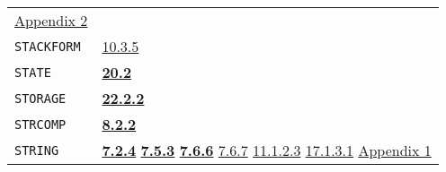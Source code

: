 \documentclass[a4paper,]{article}
\begin{document}
\begin{longtable}[]{@{}ll@{}}
\begin{minipage}[t]{0.70\columnwidth}
\href{appendix-2-predefined-subroutines.md\#appendix-2-predefined-subroutines}{Appendix 2}\strut
\end{minipage}\tabularnewline
\begin{minipage}[t]{0.24\columnwidth}\raggedright\strut
\texttt{STACKFORM}\strut
\end{minipage} & \begin{minipage}[t]{0.70\columnwidth}\raggedright\strut
\href{10-looping.md\#1035-stackform}{10.3.5}\strut
\end{minipage}\tabularnewline
\begin{minipage}[t]{0.24\columnwidth}\raggedright\strut
\texttt{STATE}\strut
\end{minipage} & \begin{minipage}[t]{0.70\columnwidth}\raggedright\strut
\textbf{\href{20-coroutines.md\#202-state-of-a-process}{20.2}}\strut
\end{minipage}\tabularnewline
\begin{minipage}[t]{0.24\columnwidth}\raggedright\strut
\texttt{STORAGE}\strut
\end{minipage} & \begin{minipage}[t]{0.70\columnwidth}\raggedright\strut
\textbf{\href{22-storage-management.md\#2222-non-garbage-collected-storage-the-primtype}{22.2.2}}\strut
\end{minipage}\tabularnewline
\begin{minipage}[t]{0.24\columnwidth}\raggedright\strut
\texttt{STRCOMP}\strut
\end{minipage} & \begin{minipage}[t]{0.70\columnwidth}\raggedright\strut
\textbf{\href{08-truth.md\#822-equality-and-membership-1}{8.2.2}}\strut
\end{minipage}\tabularnewline
\begin{minipage}[t]{0.24\columnwidth}\raggedright\strut
\texttt{STRING}\strut
\end{minipage} & \begin{minipage}[t]{0.70\columnwidth}\raggedright\strut
\textbf{\href{07-structured-objects.md\#724-string-1}{7.2.4}}
\textbf{\href{07-structured-objects.md\#753-list-vector-uvector-and-string-the-subrs-1}{7.5.3}}
\textbf{\href{07-structured-objects.md\#766-string-the-primtype-and-character-1}{7.6.6}}
\href{07-structured-objects.md\#767-bytes}{7.6.7} \href{11-input-output.md\#11123-princ}{11.1.2.3}
\href{17-macro-operations.md\#17131-read-finally}{17.1.3.1}
\href{appendix-1-a-look-inside.md\#appendix-1-a-look-inside}{Appendix 1}\strut
\end{minipage}\tabularnewline

\end{longtable}
\end{document}
